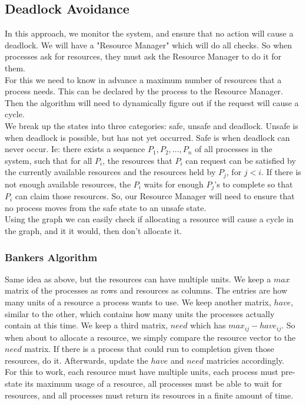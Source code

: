 \documentclass[12pt]{article}
\theoremstyle{definition}
\begin{document}
\subsection{Deadlock Avoidance}
In this approach, we monitor the system, and ensure that no action will cause a deadlock. We will have a "Resource Manager" which will do all checks. So when processes ask for resources, they must ask the Resource Manager to do it for them. 
\\ \linebreak
For this we need to know in advance a maximum number of resources that a process needs. This can be declared by the process to the Resource Manager.
Then the algorithm will need to dynamically figure out if the request will cause a cycle.
\\ \linebreak
We break up the states into three categories: safe, unsafe and deadlock. Unsafe is when deadlock is possible, but has not yet occurred. Safe is when deadlock can never occur. Ie: there exists a sequence $P_1, P_2, ... , P_n$ of all processes in the system, such that for all $P_i$, the resources that $P_i$ can request can be satisfied by the currently available resources and the resources held by $P_j$, for $j <i$. If there is not enough available resources, the $P_i$ waits for enough $P_j$'s to complete so that $P_i$ can claim those resources. So, our Resource Manager will need to ensure that no process moves from the safe state to an unsafe state. 
\\ \linebreak
Using the graph we can easily check if allocating a resource will cause a cycle in the graph, and it it would, then don't allocate it.

\subsubsection{Bankers Algorithm}
Same idea as above, but the resources can have multiple units. We keep a $max$ matrix of the processes as rows and resources as columns. The entries are how many units of a resource a process wants to use. We keep another matrix, $have$, similar to the other, which contains how many units the processes actually contain at this time. We keep a third matrix, $need$ which has $max_{ij} - have_{ij}$. So when about to allocate a resource, we simply compare the resource vector to the $need$ matrix. If there is a process that could run to completion given those resources, do it. Afterwards, update the $have$  and $need$ matricies accordingly.
\\ \linebreak
For this to work, each resource must have multiple units, each process must pre-state its maximum usage of a resource, all processes must be able to wait for resources, and all processes must return its resources in a finite amount of time.
\\ \linebreak
\end{document}
